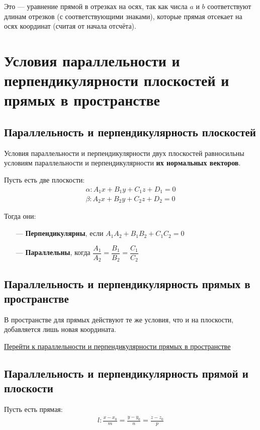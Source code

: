 \documentclass[a4paper,12pt,oneside]{extbook}
\theoremstyle{numbered}
\theoremstyle{unnumbered}
\theoremstyle{named}
\theoremstyle{unnumbered}
\theoremstyle{named}
\theoremstyle{named}
\theoremstyle{named}
\newcommand{\plink}[2]{\hyperref[#1]{\color{blue}\underline{#2}}}
\begin{document}
Это — уравнение прямой в отрезках на осях, так как числа \(a\) и \(b\) соответствуют длинам отрезков (с соответствующими знаками), которые прямая отсекает на осях координат (считая от начала отсчёта).

\section{Условия параллельности и перпендикулярности плоскостей и прямых в пространстве}
\label{sec:parallel_perpendicular_planes}

\subsection{Параллельность и перпендикулярность плоскостей}
Условия параллельности и перпендикулярности двух плоскостей равносильны условиям параллельности и перпендикулярности \textbf{их нормальных векторов}.

Пусть есть две плоскости:
\begin{gather*}
    \alpha: A_1x + B_1y + C_1z + D_1 = 0 \\
    \beta: A_2x + B_2y + C_2z + D_2 = 0
\end{gather*}

Тогда они:
\begin{itemize}
    \item[—]{\textbf{Перпендикулярны}, если \(A_1A_2 + B_1B_2 + C_1C_2 = 0\)}
    \item[—]{\textbf{Параллельны}, когда \(\dfrac{A_1}{A_2} = \dfrac{B_1}{B_2} = \dfrac{C_1}{C_2}\)}
\end{itemize}

\subsection{Параллельность и перпендикулярность прямых в пространстве}
В пространстве для прямых действуют те же условия, что и на плоскости, добавляется лишь новая координата.

\plink{sec:parallel_perpendicular_lines}{Перейти к параллельности и перпендикулярности прямых в пространстве}

\subsection{Параллельность и перпендикулярность прямой и плоскости}
Пусть есть прямая:
\begin{gather*}
    l: \frac{x - x_0}{m} = \frac{y - y_0}{n} = \frac{z - z_0}{p}
\end{gather*}
\end{document}
